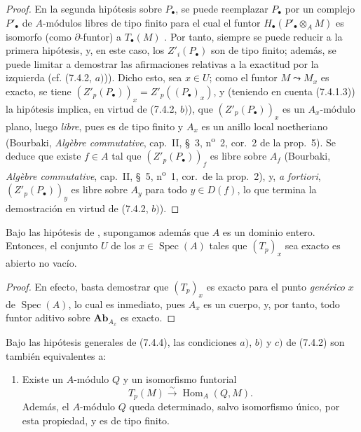 \begin{proof}
En la segunda hipótesis sobre $P_\bullet$, se puede reemplazar $P_\bullet$ por
un complejo $P'_\bullet$ de
$A$-módulos libres de tipo finito para el cual el funtor
$H_\bullet(P'_\bullet\otimes_A M)$ es isomorfo (como $\partial$-funtor) a
$T_\bullet(M)$ . Por tanto, siempre se puede reducir a la
primera hipótesis, y, en este caso, los $Z'_i(P_\bullet)$ son de
tipo finito; además, se puede limitar a demostrar las afirmaciones relativas a
la exactitud por la izquierda (cf. (7.4.2, $a)$)). Dicho esto, sea $x\in U$; como el
funtor $M\leadsto M_x$ es exacto, se tiene
$(Z'_p(P_\bullet))_x=Z'_p((P_\bullet)_x)$,
y (teniendo en cuenta (7.4.1.3)) la hipótesis implica, en virtud de
(7.4.2, $b)$), que $(Z'_p(P_\bullet))_x$ es un $A_x$-módulo plano,
luego \emph{libre}, pues es de tipo finito y $A_x$ es un anillo local noetheriano
(Bourbaki, \emph{Algèbre commutative}, cap.~II, \S~3,
n\textsuperscript{o}~2, cor.~2 de la prop.~5). Se deduce que existe $f\in A$
tal que $(Z'_p(P_\bullet))_f$ es libre sobre $A_f$ (Bourbaki,
\emph{Algèbre commutative}, cap.~II, \S~5, n\textsuperscript{o}~1, cor.~de la
prop.~2), y, \emph{a fortiori}, $(Z'_p(P_\bullet))_y$ es libre sobre $A_y$ para
todo $y\in D(f)$, lo
que termina la demostración en virtud de (7.4.2, $b)$).
\end{proof}

\begin{corollary}[7.4.5]
\label{III.7.4.5}
Bajo las hipótesis de , supongamos además que $A$ es un
dominio entero.
Entonces, el conjunto $U$ de los $x\in\operatorname{Spec}(A)$ tales que $(T_p)_x$ sea
exacto es abierto no vacío.
\end{corollary}

\begin{proof}
En efecto, basta demostrar que $(T_p)_x$ es exacto para el punto \emph{genérico} $x$
de $\operatorname{Spec}(A)$, lo cual es inmediato, pues $A_x$ es un cuerpo, y, por tanto,
todo funtor aditivo sobre $\boldsymbol{Ab}_{A_x}$ es exacto.
\end{proof}

\begin{proposition}[7.4.6]
Bajo las hipótesis generales de \textup{(7.4.4)}, las condiciones $a)$, $b)$ y $c)$ \textup{de
(7.4.2)} son también equivalentes a:
\begin{enumerate}
  \item[d)] Existe un $A$-módulo $Q$ y un isomorfismo funtorial
    \[
      T_p(M)\xrightarrow{\sim}\operatorname{Hom}_A(Q,M).
      \tag{7.4.6.1}\label{III.7.4.6.1.fr}
    \]
    Además, el $A$-módulo $Q$ queda determinado, salvo isomorfismo único, por
    esta propiedad, y es de tipo finito.
\end{enumerate}
\end{proposition}

